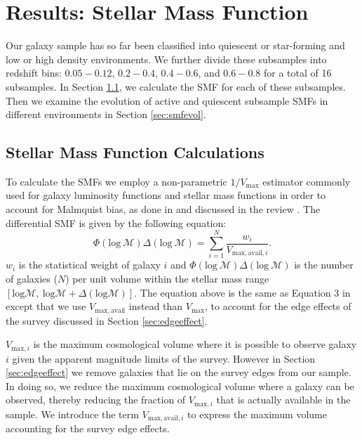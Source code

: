 \documentclass{emulateapj}
\begin{document}
\section{Results: Stellar Mass Function} \label{sec:smf}
Our galaxy sample has so far been classified into quiescent or
star-forming and low or high density environments. We further divide
these subsamples into redshift bins: $0.05-0.12$, $0.2-0.4$,
$0.4-0.6$, and $0.6-0.8$ for a total of 16 subsamples. In Section \ref{sec:smfcalc}, we calculate the SMF for each of these subsamples. Then we examine the evolution of active and quiescent subsample SMFs in different environments in Section \ref{sec:smfevol}.  
\subsection{Stellar Mass Function Calculations} \label{sec:smfcalc} 
To calculate the SMFs we employ a non-parametric $1/{V_{\mathrm{max}}}$ estimator commonly used for galaxy luminosity functions and stellar mass functions in order to account for Malmquist bias, as done in \cite{Moustakas:2013aa} and discussed in the review \cite{Johnston:2011aa}. The differential SMF is given by the following equation:
\begin{equation} \label{eq:phi}
\Phi(\mathrm{log}\: \mathcal{M}) \Delta(\mathrm{log} \:\mathcal{M}) = \sum\limits_{i=1}^{N} \frac{w_i}{V_{\mathrm{max,avail},i}}. 
\end{equation}
$w_i$ is the statistical weight of galaxy $i$ and $\Phi(\mathrm{log}\:
\mathcal{M}) \Delta(\mathrm{log}\: \mathcal{M})$ is the number of galaxies
($N$) per unit volume within the stellar mass range $[\mathrm{log}
  \mathcal{M},\: \mathrm{log} \mathcal{M}+\Delta(\mathrm{log}\mathcal{M})]$. The equation above is the same as Equation 3 in \cite{Moustakas:2013aa} except that we use $V_{\mathrm{max,avail}}$ instead than $V_{\mathrm{max}}$, to account for the edge effects of the survey discussed in Section \ref{sec:edgeeffect}. 

$V_{\mathrm{max},i}$ is the maximum cosmological volume where it is
possible to observe galaxy $i$ given the apparent magnitude limits of
the survey. However in Section \ref{sec:edgeeffect} we remove galaxies
that lie on the survey edges from our sample. In doing so, we reduce the
maximum cosmological volume where a galaxy can be observed, thereby
reducing the fraction of $V_{\mathrm{max},i}$ that is actually available
in the sample. We introduce the term $V_{\mathrm{max,avail},i}$ to express
the maximum volume accounting for the survey edge effects.
\end{document}
